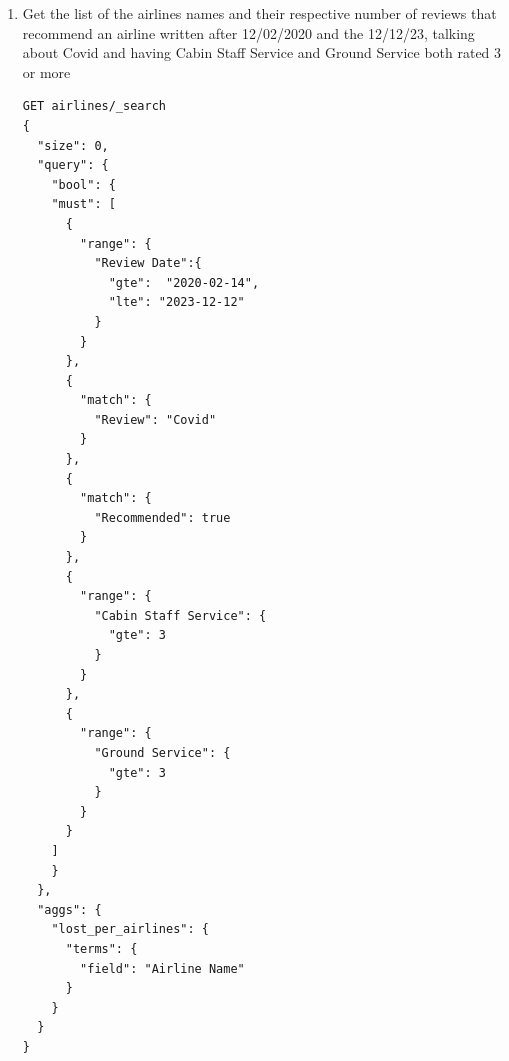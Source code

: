 \documentclass{Configuration_Files/PoliMi3i_thesis}
\begin{document}
\begin{enumerate}
    \item Get the list of the airlines names and their respective number of reviews that recommend an airline written after 12/02/2020 and the 12/12/23, talking about Covid and having Cabin Staff Service and Ground Service both rated 3 or more
\begin{verbatim}
GET airlines/_search
{
  "size": 0,
  "query": {
    "bool": {
    "must": [
      {
        "range": {
          "Review Date":{
            "gte":  "2020-02-14",
            "lte": "2023-12-12"
          }
        }
      },
      {
        "match": {
          "Review": "Covid"
        }
      },
      {
        "match": {
          "Recommended": true
        }
      },
      {
        "range": {
          "Cabin Staff Service": {
            "gte": 3
          }
        }
      }, 
      {
        "range": {
          "Ground Service": {
            "gte": 3
          }
        }
      }
    ]
    }
  },
  "aggs": {
    "lost_per_airlines": {
      "terms": {
        "field": "Airline Name"
      }
    }
  }
}
\end{verbatim}
    


\end{enumerate}
\end{document}
